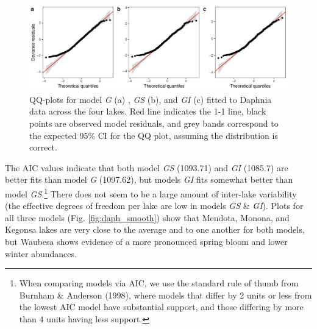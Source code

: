 \documentclass[12pt]{article}
\let\rmarkdownfootnote\footnote%
\def\footnote{\protect\rmarkdownfootnote}
\begin{document}
\begin{figure}
\centering
\includegraphics{../figures/zoo_daph_diag-1.pdf}
\caption{\label{fig:zoo_daph_diag_plot} QQ-plots for model \emph{G} (a)
, \emph{GS} (b), and \emph{GI} (c) fitted to Daphnia data across the
four lakes. Red line indicates the 1-1 line, black points are observed
model residuals, and grey bands correspond to the expected 95\% CI for
the QQ plot, assuming the distribution is correct.}
\end{figure}

The AIC values indicate that both model \emph{GS} (1093.71) and
\emph{GI} (1085.7) are better fits than model \emph{G} (1097.62), but
models \emph{GI} fits somewhat better than model \emph{GS}.\footnote{When
  comparing models via AIC, we use the standard rule of thumb from
  Burnham \& Anderson (1998), where models that differ by 2 units or
  less from the lowest AIC model have substantial support, and those
  differing by more than 4 units having less support.} There does not
seem to be a large amount of inter-lake variability (the effective
degrees of freedom per lake are low in models \emph{GS} \& \emph{GI}).
Plots for all three models (Fig. \ref{fig:daph_smooth}) show that
Mendota, Monona, and Kegonsa lakes are very close to the average and to
one another for both models, but Waubesa shows evidence of a more
pronounced spring bloom and lower winter abundances.
\end{document}
